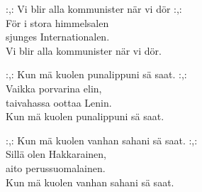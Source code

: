 :,: Vi blir alla kommunister när vi dör :,:\\
För i stora himmelsalen\\
sjunges Internationalen.\\
Vi blir alla kommunister när vi dör.

:,: Kun mä kuolen punalippuni sä saat. :,:\\
Vaikka porvarina elin,\\
taivahassa oottaa Lenin.\\
Kun mä kuolen punalippuni sä saat.

:,: Kun mä kuolen vanhan sahani sä saat. :,:\\
Sillä olen Hakkarainen,\\
aito perussuomalainen.\\
Kun mä kuolen vanhan sahani sä saat.